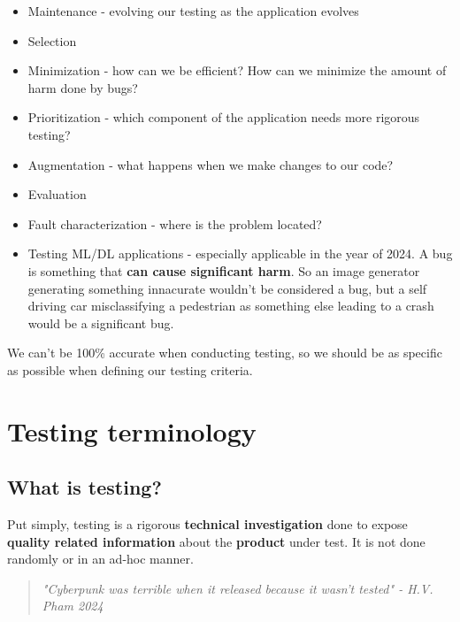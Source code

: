 \documentclass[12pt]{book}
\begin{document}
\begin{itemize}
  \item Maintenance - evolving our testing as the application evolves
  \item Selection
  \item Minimization - how can we be efficient? How can we minimize the amount of harm done by bugs?
  \item Prioritization - which component of the application needs more rigorous testing?
  \item Augmentation - what happens when we make changes to our code?
  \item Evaluation
  \item Fault characterization - where is the problem located?
  \item Testing ML/DL applications - especially applicable in the year of 2024. A bug is something that \textbf{can cause significant harm}. So an image generator generating something innacurate wouldn't be considered a bug, but a self driving car misclassifying a pedestrian as something else leading to a crash would be a significant bug.
\end{itemize}
We can't be 100\% accurate when conducting testing, so we should be as specific as possible when defining our testing criteria.

\chapter{Testing terminology}

\section*{What is testing?}
Put simply, testing is a rigorous \textbf{technical investigation} done to expose \textbf{quality related information} about the \textbf{product} under test. It is not done randomly or in an ad-hoc manner.

\begin{quote}
  \textit{"Cyberpunk was terrible when it released because it wasn't tested" - H.V. Pham 2024}
\end{quote}
\end{document}
